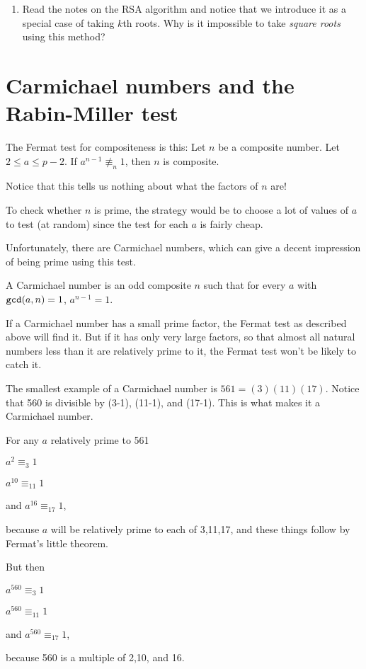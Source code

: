 \documentclass[12pt]{article}
\begin{document}
\begin{enumerate}
\item Read the notes on the RSA algorithm and notice that we introduce it as a special case of taking $k$th roots.  Why is it impossible to take {\em square roots\/} using this method?

\end{enumerate}

\section{Carmichael numbers and the Rabin-Miller test}

The Fermat test for compositeness is this:  Let $n$ be a composite number.  Let $2 \leq a \leq p-2$.  If $a^{n-1} \not\equiv_n 1$, then $n$ is composite.

Notice that this tells us nothing about what the factors of $n$ are!

To check whether $n$ is prime, the strategy would be to choose a lot of values of $a$ to test (at random) since the test for each $a$ is fairly cheap.

Unfortunately, there are Carmichael numbers, which can give a decent impression of being prime using this test.

A Carmichael number is an odd composite $n$ such that for every $a$ with ${\tt gcd}(a,n)=1$, $a^{n-1}=1$.

If a Carmichael number has a small prime factor, the Fermat test as described above will find it.  But if it has only very large factors, so that almost all natural numbers less than it are relatively prime to it, the Fermat test won't be likely to catch it.

The smallest example of a Carmichael number is $561 = (3)(11)(17)$.  Notice that 560 is divisible by (3-1), (11-1), and (17-1).
This is what makes it a Carmichael number.

For any $a$ relatively prime to 561

$a^2 \equiv_3 1$

$a^{10} \equiv_{11} 1$

and $a^{16}\equiv_{17} 1$,

because $a$ will be relatively prime to each of 3,11,17, and these things follow by Fermat's little theorem.

But then 

$a^{560} \equiv_3 1$

$a^{560} \equiv_{11} 1$

and $a^{560} \equiv_{17} 1$,

because 560 is a multiple of 2,10, and 16.
\end{document}
